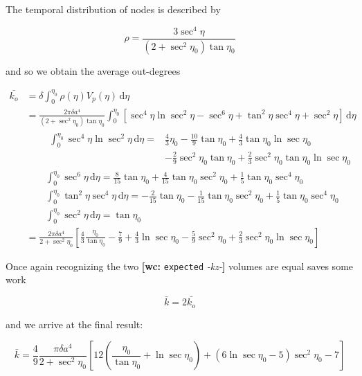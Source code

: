 \documentclass[preprint,notitlepage,amsmath,amssymb,floatfix]{revtex4-1}
\newcommand{\XXX}[3]{{\bf [#1: } {\tt #3} {\it -#2-}{\bf ]}}
\begin{document}
\noindent The temporal distribution of nodes is described by

\begin{equation}
\label{eq:rhoeta3}
\rho = \frac{3\sec^4\eta}{\left(2+\sec^2\eta_0\right)\tan\eta_0}
\end{equation}

\noindent and so we obtain the average out-degrees

\begin{align}
\bar{k_o} &= \delta\int_0^{\eta_0}\!\rho\left(\eta\right)V_p\left(\eta\right)\,\mathrm d\eta \\
  &= \frac{2\pi\delta a^4}{\left(2+\sec^2\eta_0\right)\tan\eta_0}\int_0^{\eta_0}\!\left[\sec^4\eta\ln\sec^2\eta - \sec^6\eta + \tan^2\eta\sec^4\eta+\sec^2\eta\right]\,\mathrm d\eta \\
  &\qquad\begin{aligned}
    \int_0^{\eta_0}\!\sec^4\eta\ln\sec^2\eta\,\mathrm d\eta = &\frac{4}{3}\eta_0 - \frac{10}{9}\tan\eta_0 + \frac{4}{3}\tan\eta_0\ln\sec\eta_0 \\
    &-\frac{2}{9}\sec^2\eta_0\tan\eta_0 + \frac{2}{3}\sec^2\eta_0\tan\eta_0\ln\sec\eta_0
  \end{aligned} \\
  &\qquad\int_0^{\eta_0}\!\sec^6\eta\,\mathrm d\eta = \frac{8}{15}\tan\eta_0 + \frac{4}{15}\tan\eta_0\sec^2\eta_0 + \frac{1}{5}\tan\eta_0\sec^4\eta_0 \\
  &\qquad\int_0^{\eta_0}\!\tan^2\eta\sec^4\eta\,\mathrm d\eta = -\frac{2}{15}\tan\eta_0 - \frac{1}{15}\tan\eta_0\sec^2\eta_0 + \frac{1}{5}\tan\eta_0\sec^4\eta_0 \\
  &\qquad\int_0^{\eta_0}\!\sec^2\eta\,\mathrm d\eta = \tan\eta_0 \\
  &=\frac{2\pi\delta a^4}{2+\sec^2\eta_0}\left[\frac{4}{3}\frac{\eta_0}{\tan\eta_0} - \frac{7}{9} + \frac{4}{3}\ln\sec\eta_0 - \frac{5}{9}\sec^2\eta_0 + \frac{2}{3}\sec^2\eta_0\ln\sec\eta_0\right]
\end{align}

\noindent Once again recognizing the two \XXX{wc}{kz}{expected} volumes are equal saves some work

\begin{equation}
\bar{k} = 2\bar{k_o}
\end{equation}

\noindent and we arrive at the final result:

\begin{equation}
\label{eq:finalk3}
\bar k = \frac{4}{9}\frac{\pi\delta a^4}{2+\sec^2\eta_0}\left[12\left(\frac{\eta_0}{\tan\eta_0}+\ln\sec\eta_0\right)+\left(6\ln\sec\eta_0-5\right)\sec^2\eta_0-7\right]
\end{equation}
\end{document}
